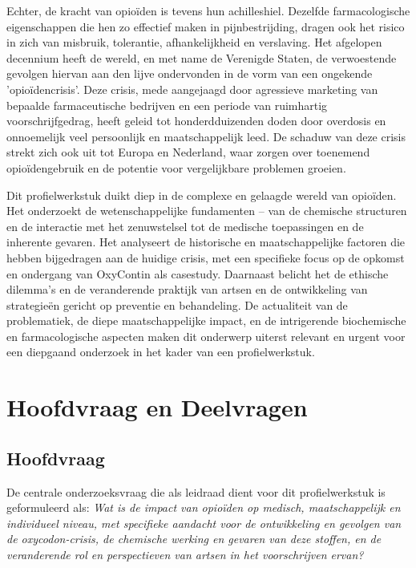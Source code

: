 \documentclass[11pt, a4paper]{report} %
\begin{document}
Echter, de kracht van opioïden is tevens hun achilleshiel. Dezelfde farmacologische eigenschappen die hen zo effectief maken in pijnbestrijding, dragen ook het risico in zich van misbruik, tolerantie, afhankelijkheid en verslaving. Het afgelopen decennium heeft de wereld, en met name de Verenigde Staten, de verwoestende gevolgen hiervan aan den lijve ondervonden in de vorm van een ongekende 'opioïdencrisis'. Deze crisis, mede aangejaagd door agressieve marketing van bepaalde farmaceutische bedrijven en een periode van ruimhartig voorschrijfgedrag, heeft geleid tot honderdduizenden doden door overdosis en onnoemelijk veel persoonlijk en maatschappelijk leed. De schaduw van deze crisis strekt zich ook uit tot Europa en Nederland, waar zorgen over toenemend opioïdengebruik en de potentie voor vergelijkbare problemen groeien.

Dit profielwerkstuk duikt diep in de complexe en gelaagde wereld van opioïden. Het onderzoekt de wetenschappelijke fundamenten – van de chemische structuren en de interactie met het zenuwstelsel tot de medische toepassingen en de inherente gevaren. Het analyseert de historische en maatschappelijke factoren die hebben bijgedragen aan de huidige crisis, met een specifieke focus op de opkomst en ondergang van OxyContin als casestudy. Daarnaast belicht het de ethische dilemma's en de veranderende praktijk van artsen en de ontwikkeling van strategieën gericht op preventie en behandeling. De actualiteit van de problematiek, de diepe maatschappelijke impact, en de intrigerende biochemische en farmacologische aspecten maken dit onderwerp uiterst relevant en urgent voor een diepgaand onderzoek in het kader van een profielwerkstuk.

\section{Hoofdvraag en Deelvragen}
\subsection{Hoofdvraag}
De centrale onderzoeksvraag die als leidraad dient voor dit profielwerkstuk is geformuleerd als:
\textit{Wat is de impact van opioïden op medisch, maatschappelijk en individueel niveau, met specifieke aandacht voor de ontwikkeling en gevolgen van de oxycodon-crisis, de chemische werking en gevaren van deze stoffen, en de veranderende rol en perspectieven van artsen in het voorschrijven ervan?}
\end{document}
